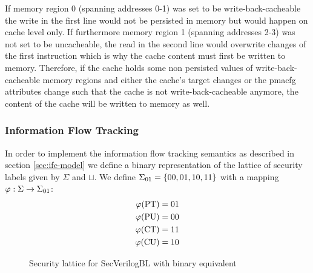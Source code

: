 If memory region 0 (spanning addresses 0-1) was set to be write-back-cacheable the write in the first line would not be persisted in memory but would happen on cache level only.
If furthermore memory region 1 (spanning addresses 2-3) was not set to be uncacheable, the read in the second line would overwrite changes of the first instruction which is why the cache content must first be written to memory.
Therefore, if the cache holds some non persisted values of write-back-cacheable memory regions and either the cache's target changes or the \gls{pmacfg} attributes change such that the cache is not write-back-cacheable anymore, the content of the cache will be written to memory as well.

\subsubsection{Information Flow Tracking}
\label{sec:ifc-implementation}

In order to implement the information flow tracking semantics as described in section \ref{sec:ifc-model} we define a binary representation of the lattice of security labels given by $ \Sigma $ and $ \sqcup $.
We define $ \Sigma_{01} = \{ 00, 01, 10, 11 \}$ with a mapping $ \varphi : \Sigma \rightarrow \Sigma_{01} $:
\begin{align*}
    \varphi(\text{PT}) &= 01 \\
    \varphi(\text{PU}) &= 00 \\
    \varphi(\text{CT}) &= 11 \\
    \varphi(\text{CU}) &= 10
\end{align*}

\begin{figure}
    \centering
    \caption{Security lattice for SecVerilogBL \cite{Ferraiuolo17} with binary equivalent}
    \label{fig:sec-lattice-bin}
\end{figure}

